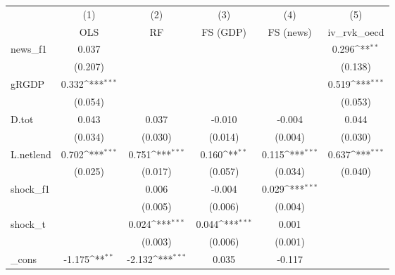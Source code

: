 {
\def\sym#1{\ifmmode^{#1}\else\(^{#1}\)\fi}
\begin{tabular}{l*{5}{c}}
\toprule
            &\multicolumn{1}{c}{(1)}&\multicolumn{1}{c}{(2)}&\multicolumn{1}{c}{(3)}&\multicolumn{1}{c}{(4)}&\multicolumn{1}{c}{(5)}\\
            &\multicolumn{1}{c}{OLS}&\multicolumn{1}{c}{RF}&\multicolumn{1}{c}{FS (GDP)}&\multicolumn{1}{c}{FS (news)}&\multicolumn{1}{c}{iv\_rvk\_oecd}\\
\midrule
news\_f1     &       0.037         &                     &                     &                     &       0.296\sym{**} \\
            &     (0.207)         &                     &                     &                     &     (0.138)         \\
\addlinespace
gRGDP       &       0.332\sym{***}&                     &                     &                     &       0.519\sym{***}\\
            &     (0.054)         &                     &                     &                     &     (0.053)         \\
\addlinespace
D.tot       &       0.043         &       0.037         &      -0.010         &      -0.004         &       0.044         \\
            &     (0.034)         &     (0.030)         &     (0.014)         &     (0.004)         &     (0.030)         \\
\addlinespace
L.netlend   &       0.702\sym{***}&       0.751\sym{***}&       0.160\sym{**} &       0.115\sym{***}&       0.637\sym{***}\\
            &     (0.025)         &     (0.017)         &     (0.057)         &     (0.034)         &     (0.040)         \\
\addlinespace
shock\_f1    &                     &       0.006         &      -0.004         &       0.029\sym{***}&                     \\
            &                     &     (0.005)         &     (0.006)         &     (0.004)         &                     \\
\addlinespace
shock\_t     &                     &       0.024\sym{***}&       0.044\sym{***}&       0.001         &                     \\
            &                     &     (0.003)         &     (0.006)         &     (0.001)         &                     \\
\addlinespace
\_cons      &      -1.175\sym{**} &      -2.132\sym{***}&       0.035         &      -0.117         &                     \\

\end{tabular}}
